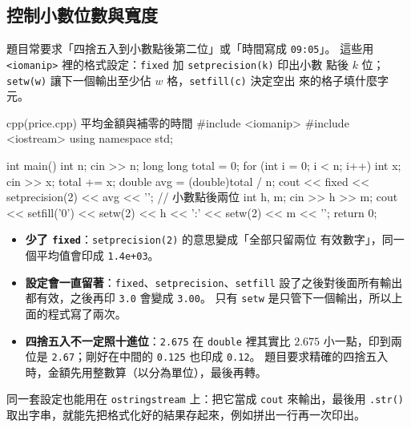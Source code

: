 \subsection{控制小數位數與寬度}

題目常要求「四捨五入到小數點後第二位」或「時間寫成 \texttt{09:05}」。 這些用
\texttt{<iomanip>} 裡的格式設定：\texttt{fixed} 加 \texttt{setprecision(k)} 印出小數
點後 $k$ 位；\texttt{setw(w)} 讓下一個輸出至少佔 $w$ 格，\texttt{setfill(c)} 決定空出
來的格子填什麼字元。

\begin{example}[label=ex:price]{cpp}{(price.cpp) 平均金額與補零的時間}
#include <iomanip>
#include <iostream>
using namespace std;

int main() {
    int n;
    cin >> n;
    long long total = 0;
    for (int i = 0; i < n; i++) {
        int x;
        cin >> x;
        total += x;
    }
    double avg = (double)total / n;
    cout << fixed << setprecision(2) << avg << '\n';   // 小數點後兩位
    int h, m;
    cin >> h >> m;
    cout << setfill('0') << setw(2) << h << ':' << setw(2) << m << '\n';
    return 0;
}
\end{example}


\begin{itemize}
\item \textbf{少了 \texttt{fixed}}：\texttt{setprecision(2)} 的意思變成「全部只留兩位
有效數字」，同一個平均值會印成 \texttt{1.4e+03}。
\item \textbf{設定會一直留著}：\texttt{fixed}、\texttt{setprecision}、\texttt{setfill}
設了之後對後面所有輸出都有效，之後再印 \texttt{3.0} 會變成 \texttt{3.00}。 只有
\texttt{setw} 是只管下一個輸出，所以上面的程式寫了兩次。
\item \textbf{四捨五入不一定照十進位}：\texttt{2.675} 在 \texttt{double} 裡其實比
$2.675$ 小一點，印到兩位是 \texttt{2.67}；剛好在中間的 \texttt{0.125} 也印成
\texttt{0.12}。 題目要求精確的四捨五入時，金額先用整數算（以分為單位），最後再轉。
\end{itemize}

同一套設定也能用在 \texttt{ostringstream} 上：把它當成 \texttt{cout} 來輸出，最後用
\texttt{.str()} 取出字串，就能先把格式化好的結果存起來，例如拼出一行再一次印出。

